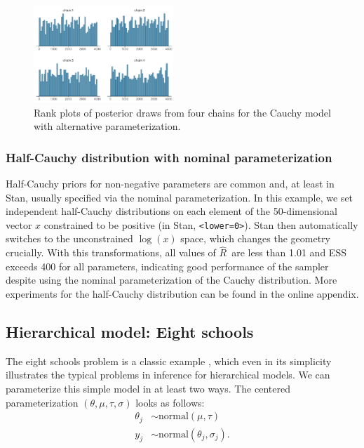 \documentclass[american,]{article}
\newcommand{\Rhat}{$\widehat{R}$}
\theoremstyle{definition}
\begin{document}
\begin{figure}[tp]
  \centering
  \includegraphics[width=0.47\textwidth]{graphics/hist-fit-alt1-1.pdf}
  \caption{Rank plots of posterior draws from four chains for the Cauchy model with alternative parameterization.}
  \label{fig:hist-fit-alt1-1}
\end{figure}

\hypertarget{half-cauchy-distribution-with-nominal-parameterization}{%
\subsubsection*{Half-Cauchy distribution with nominal
parameterization}\label{half-cauchy-distribution-with-nominal-parameterization}}

Half-Cauchy priors for non-negative parameters are common and, at least in Stan, 
usually specified via the nominal parameterization.
In this example, we set independent half-Cauchy distributions on each element
of the 50-dimensional vector $x$ constrained to be positive
(in Stan, \texttt{\textless{}lower=0\textgreater{}}). Stan then
automatically switches to the unconstrained \(\log(x)\) space, which
changes the geometry crucially. With this transformations, all values of \Rhat\ are less than 1.01 and ESS exceeds 400 for all parameters, indicating good performance of the sampler despite using the nominal parameterization of
the Cauchy distribution. More experiments for the half-Cauchy distribution 
can be found in the online appendix.




\hypertarget{eightschools}{%
\subsection{Hierarchical model: Eight schools}\label{eightschools}}

The eight schools problem is a classic example
\citep[see Section 5.5 in][]{BDA3}, which even in its
simplicity illustrates the typical problems in inference for
hierarchical models. We can parameterize this simple model
in at least two ways. The centered parameterization $(\theta, \mu,
\tau, \sigma)$ looks as follows:
\begin{align*}
\theta_j &\sim \text{normal}(\mu, \tau) \\
y_j &\sim \text{normal}(\theta_j, \sigma_j).
\end{align*}
\end{document}
